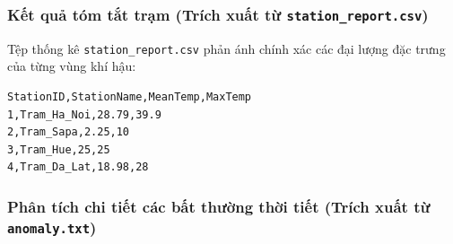 \subsubsection{Kết quả tóm tắt trạm (Trích xuất từ \texttt{station\_report.csv})}
Tệp thống kê \texttt{station\_report.csv} phản ánh chính xác các đại lượng đặc trưng của từng vùng khí hậu:
\begin{lstlisting}[style=mystyle, caption=Nội dung tệp station\_report.csv kết xuất thực tế]
StationID,StationName,MeanTemp,MaxTemp
1,Tram_Ha_Noi,28.79,39.9
2,Tram_Sapa,2.25,10
3,Tram_Hue,25,25
4,Tram_Da_Lat,18.98,28
\end{lstlisting}

\subsubsection{Phân tích chi tiết các bất thường thời tiết (Trích xuất từ \texttt{anomaly.txt})}

